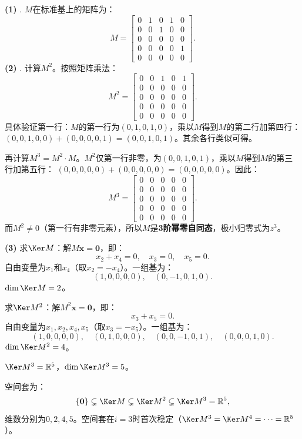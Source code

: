 \documentclass[12pt,UTF8,fontset=none]{ctexbook}
\begin{document}
\begin{so}
\textbf{(1)} .\;
$M$在标准基上的矩阵为：
$$
M = \begin{bmatrix}
0 & 1 & 0 & 1 & 0 \\
0 & 0 & 1 & 0 & 0 \\
0 & 0 & 0 & 0 & 0 \\
0 & 0 & 0 & 0 & 1 \\
0 & 0 & 0 & 0 & 0
\end{bmatrix}.
$$
\textbf{(2)} .\;
计算$M^2$。按照矩阵乘法：
$$
M^2 = \begin{bmatrix}
0 & 0 & 1 & 0 & 1 \\
0 & 0 & 0 & 0 & 0 \\
0 & 0 & 0 & 0 & 0 \\
0 & 0 & 0 & 0 & 0 \\
0 & 0 & 0 & 0 & 0
\end{bmatrix}.
$$
具体验证第一行：$M$的第一行为$(0,1,0,1,0)$，乘以$M$得到$M$的第二行加第四行：
$(0,0,1,0,0) + (0,0,0,0,1) = (0,0,1,0,1)$。其余各行类似可得。

再计算$M^3 = M^2 \cdot M$。$M^2$仅第一行非零，为$(0,0,1,0,1)$，乘以$M$得到$M$的第三行加第五行：
$(0,0,0,0,0) + (0,0,0,0,0) = (0,0,0,0,0)$。因此：
$$M^3 = \begin{bmatrix} 0 & 0 & 0 & 0 & 0 \\ 0 & 0 & 0 & 0 & 0 \\ 0 & 0 & 0 & 0 & 0 \\ 0 & 0 & 0 & 0 & 0 \\ 0 & 0 & 0 & 0 & 0 \end{bmatrix}.$$
而$M^2 \neq 0$（第一行有非零元素），所以$M$是\textbf{3阶幂零自同态}，极小归零式为$z^3$。

\textbf{(3)} 求$\Ker M$：解$M\mathbf{x} = \mathbf{0}$，即：
$$x_2 + x_4 = 0, \quad x_3 = 0, \quad x_5 = 0.$$
自由变量为$x_1$和$x_4$（取$x_2 = -x_4$）。一组基为：
$$(1,0,0,0,0), \quad (0,-1,0,1,0).$$
$\dim \Ker M = 2$。

求$\Ker M^2$：解$M^2\mathbf{x} = \mathbf{0}$，即：
$$x_3 + x_5 = 0.$$
自由变量为$x_1, x_2, x_4, x_5$（取$x_3 = -x_5$）。一组基为：
$$(1,0,0,0,0), \quad (0,1,0,0,0), \quad (0,0,-1,0,1), \quad (0,0,0,1,0).$$
$\dim \Ker M^2 = 4$。

$\Ker M^3 = \mathbb{R}^5$，$\dim \Ker M^3 = 5$。

空间套为：
$$\{\mathbf{0}\} \subsetneq \Ker M \subsetneq \Ker M^2 \subsetneq \Ker M^3 = \mathbb{R}^5,$$
维数分别为$0, 2, 4, 5$。空间套在$i=3$时首次稳定（$\Ker M^3 = \Ker M^4 = \cdots = \mathbb{R}^5$）。


\end{so}
\end{document}
